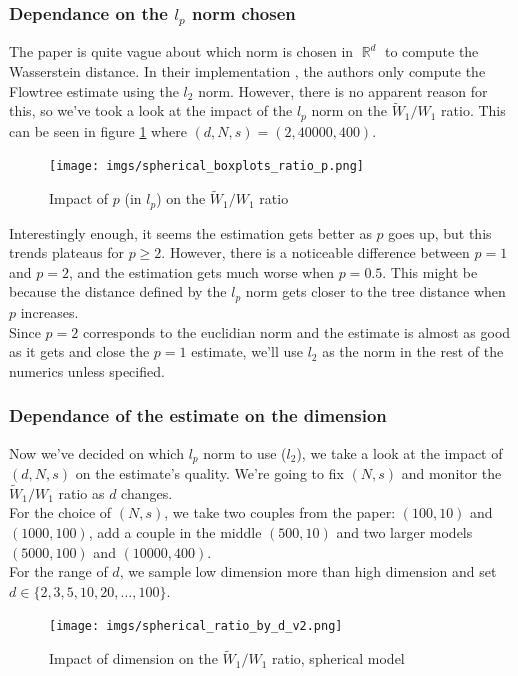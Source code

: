 \documentclass[11pt]{article}
\DeclareMathOperator\R{\mathbb{R}}
\begin{document}
\subsubsection{Dependance on the $l_p$ norm chosen}
The paper is quite vague about which norm is chosen in $\R^d$ to compute the Wasserstein distance. In their implementation \cite{FlowtreeGit}, the authors only compute the Flowtree estimate using the $l_2$ norm. However, there is no apparent reason for this, so we've took a look at the impact of the $l_p$ norm on the $\widetilde{W}_1 / W_1$ ratio. This can be seen in figure \ref{spherical_boxplots} where $(d, N, s) = (2, 40000, 400)$.

\begin{figure}[h]
\centering
\texttt{[image: imgs/spherical\_boxplots\_ratio\_p.png]}
\caption{Impact of $p$ (in $l_p$) on the $\widetilde{W}_1 / W_1$ ratio}
\label{spherical_boxplots}
\end{figure}

Interestingly enough, it seems the estimation gets better as $p$ goes up, but this trends plateaus for $p \geq 2$. However, there is a noticeable difference between $p=1$ and $p=2$, and the estimation gets much worse when $p=0.5$. This might be because the distance defined by the $l_p$ norm gets closer to the tree distance when $p$ increases.\\
Since $p=2$ corresponds to the euclidian norm and the estimate is almost as good as it gets and close the $p=1$ estimate, we'll use $l_2$ as the norm in the rest of the numerics unless specified.

\subsubsection{Dependance of the estimate on the dimension}
Now we've decided on which $l_p$ norm to use ($l_2$), we take a look at the impact of $(d, N, s)$ on the estimate's quality. We're going to fix $(N, s)$ and monitor the $\widetilde{W}_1 / W_1$ ratio as $d$ changes.\\
For the choice of $(N,s)$, we take two couples from the paper: $(100, 10)$ and $(1000, 100)$, add a couple in the middle $(500, 10)$ and two larger models $(5000, 100)$ and $(10000, 400)$.\\
For the range of $d$, we sample low dimension more than high dimension and set $d \in \lbrace 2, 3, 5, 10, 20, \dots, 100 \rbrace$.\\

\begin{figure}[h]
\centering
\texttt{[image: imgs/spherical\_ratio\_by\_d\_v2.png]}
\caption{Impact of dimension on the $\widetilde{W}_1 / W_1$ ratio, spherical model}
\label{spherical_ratio_by_d_v2}
\end{figure}
\end{document}

